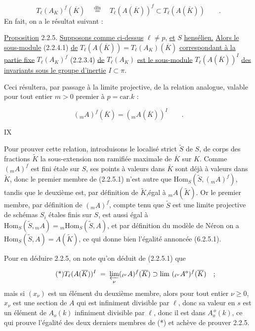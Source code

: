 \begin{equation}\tag{2.2.4.1}
T_{\ell}(A_{K})^{f}(\overline{K}) \quad \stackrel{\mathrm{dfn}}{=} \quad T_{\ell}(A(\overline{K}))^{f} \subset T_{\ell}(A(\overline{K})) \qquad .
\end{equation}
En fait, on a le résultat suivant :

\underline{Proposition} 2.2.5. \underline{Supposons comme ci-dessus} $\ell \neq p$, \underline{et} $S$ \underline{hensélien.} \underline{Alors le sous-module} (2.2.4.1) \underline{de} $T_{\ell}(A(\overline{K})) = T_{\ell}(A_{K})(\overline{K})$ \underline{correspondant à la partie fixe} $T_{\ell}(A_{K})^{f}$ (2.2.3.4) \underline{de} $T_{\ell}(A_{K})$ \underline{est le sous-module} $T_{\ell}(A(\overline{K}))^{I}$ \underline{des invariants sous le groupe d'inertie} $I \subset \pi$.

Ceci résultera, par passage à la limite projective, de la relation analogue, valable pour tout entier $m > 0$ premier à $p = \mathrm{car}.k$ :

\begin{equation}\tag{2.2.5.1}
({}_{m}A)^{f}(\overline{K}) = ({}_{m}A(\overline{K}))^{I} \qquad .
\end{equation}



IX

Pour prouver cette relation, introduisons le localisé strict $\tilde{S}$ de $S$, de corps des fractions $\tilde{K}$ la sous-extension non ramifiée maximale de $\overline{K}$ sur $K$. Comme $({}_{m}A)^{f}$ est fini étale sur $S$, ses points à valeurs dans $\overline{K}$ sont déjà à valeurs dans $\tilde{K}$, donc le premier membre de (2.2.5.1) n'est autre que $\mathrm{Hom}_{S}(\tilde{S} , ({}_{m}A)^{f})$, tandis que le deuxième est, par définition de $\tilde{K}$,égal à ${}_{m}A(\tilde{K})$. Or le premier membre, par définition de $({}_{m}A)^{f}$, compte tenu que $\tilde{S}$ est une limite projective de schémas $S_{i}$ étales finis sur $S$, est aussi égal à $\mathrm{Hom}_{S}(\tilde{S} , {}_{m}A) = {}_{m}\mathrm{Hom}_{S}(\tilde{S},A)$, et par définition du modèle de Néron on a $\mathrm{Hom}_{S}(\tilde{S},A) = A(\tilde{K})$, ce qui donne bien l'égalité annoncée (6.2.5.1).

Pour en déduire 2.2.5, on note qu'on déduit de (2.2.5.1) que

\begin{equation}\tag{*}
T_{\ell}(A(\overline{K}))^{I} \;=\; \varprojlim_{\nu} ({}_{\ell^{\nu}}A)^{f}(\overline{K}) \supset \lim\ ({}_{\ell^{\nu}}A^{o})^{f}(\overline{K}) \quad ;
\end{equation}
mais si $(x_{\nu})$ est un élément du deuxième membre, alors pour tout entier $\nu \geq 0$, $x_{\nu}$ est une section de $A$ qui est infiniment divisible par $\ell$, donc sa valeur en $s$ est un élément de $A_{o}(k)$ infiniment divisible par $\ell$, donc il est dans $A_{o}^{\,o}(k)$, ce qui prouve l'égalité des deux derniers membres de (*) et achève de prouver 2.2.5.


